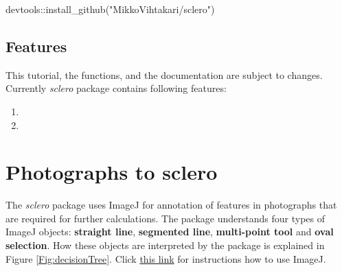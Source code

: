 \documentclass[11pt, a4paper]{article}
\newcommand{\sclero}{\textit{sclero}\xspace}
\begin{document}
\begin{Schunk}
\begin{Sinput}
 devtools::install_github("MikkoVihtakari/sclero")
\end{Sinput}
\end{Schunk}

\subsection{Features}

This tutorial, the functions, and the documentation are subject to changes. Currently \sclero package contains following features:

\begin{enumerate}
\item {}
\item {}
\end{enumerate}

\clearpage
\section{Photographs to sclero} \label{sec:annotation}

The \sclero package uses ImageJ for annotation of features in photographs that are required for further calculations. The package understands four types of ImageJ objects: \textbf{straight line}, \textbf{segmented line}, \textbf{multi-point tool} and \textbf{oval selection}. How these objects are interpreted by the package is explained in Figure \ref{Fig:decisionTree}. Click \href{http://imagej.nih.gov/ij/docs/guide/user-guide.pdf}{this link} for instructions how to use ImageJ.
\end{document}
